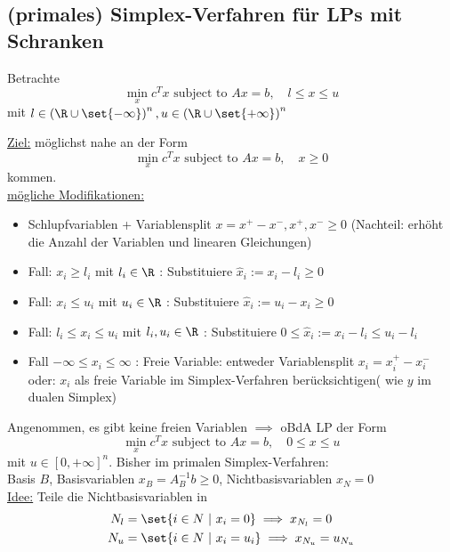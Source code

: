 \subsection{(primales) Simplex-Verfahren für LPs mit Schranken}
Betrachte
\begin{equation*}
	\min_{x} c^{T} x \text{ subject to } Ax = b ,\quad l \leq x \leq u
\end{equation*}
mit $l \in \left(\R \cup \set{ - \infty } \right)^n,u \in \left(\R \cup \set{ +\infty } \right)^n $

\underline{Ziel:} möglichst nahe an der Form
\begin{equation*}
	\min_{x} c^{T} x \text{ subject to } Ax = b ,\quad x \geq 0
\end{equation*}
kommen.\\
\underline{mögliche Modifikationen:}
\begin{itemize}
	\item Schlupfvariablen + Variablensplit $x = x^+ -x^-, x^+,x^- \geq0 $ (Nachteil: erhöht die Anzahl der Variablen und linearen Gleichungen)
	\item Fall: $x_{i} \geq l_{i}$ mit $l_{i}\in \R$ : Substituiere $\hat{x}_{i} := x_{i}- l_{i}\geq 0$
	\item Fall: $x_{i} \leq u_{i}$ mit $u_{i}\in \R$ : Substituiere  $\hat{x}_{i} := u_{i}- x_{i}\geq 0$
	\item Fall: $l_{i} \leq x_{i} \leq u_{i}$ mit $l_{i},u_{i} \in \R$ : Substituiere $0 \leq \hat{x}_{i} := x_{i}- l_{i} \leq u_{i}-l_{i}$
	\item Fall $-\infty \leq x_{i} \leq \infty$ : Freie Variable: entweder Variablensplit $x_{i}= x_{i}^+ - x_{i}^-$ oder: $x_{i}$ als freie Variable im Simplex-Verfahren berücksichtigen( wie $y$ im dualen Simplex)
\end{itemize}
Angenommen, es gibt keine freien Variablen $\implies$ oBdA LP der Form
\begin{equation*}
	\min_{x} c^{T} x \text{ subject to } Ax = b, \quad 0 \leq x \leq u
\end{equation*}
mit $u \in [0, + \infty]^n$.\nl
Bisher im primalen Simplex-Verfahren:\\
Basis $B$, Basisvariablen $x_{B}= A_{B}^{-1} b \geq 0$, Nichtbasisvariablen $x_{N}=0$ \\
\underline{Idee:} Teile die Nichtbasisvariablen in
\begin{align*}
	N_{l} &= \set{ i \in N \ | \ x_{i} = 0  } \implies x_{N_{l}}=0\\
	N_{u} &= \set{ i \in N \ | \ x_{i} = u_{i}  } \implies x_{N_{u}}=u_{N_{u}}
\end{align*}
